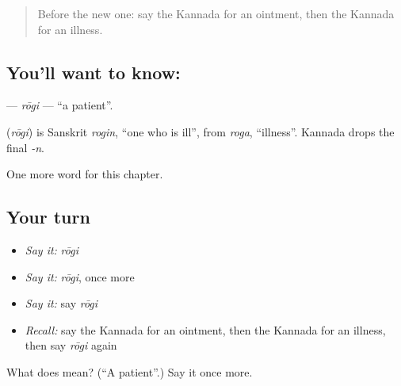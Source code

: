 \label{lesson:KA-C208-rogi}



\begin{quote}
Before the new one: say the Kannada for an ointment, then the Kannada for an illness.
\end{quote}

\subsection*{You'll want to know: }
\textbf{} — \emph{rōgi} — \textquotedblleft{}a patient\textquotedblright{}.

\begin{cousinweb}
\textbf{} (\emph{rōgi}) is Sanskrit \emph{rogin}, \textquotedblleft{}one who is ill\textquotedblright{}, from \emph{roga}, \textquotedblleft{}illness\textquotedblright{}. Kannada drops the final \emph{-n}.
\end{cousinweb}

\begin{grammarlens}[title={What you've built}]
One more word for this chapter.
\end{grammarlens}

\subsection*{Your turn}
\begin{itemize}
\raggedright
  \item \emph{Say it:} \emph{rōgi}
  \item \emph{Say it:} \emph{rōgi}, once more
  \item \emph{Say it:} say \emph{rōgi}
  \item \emph{Recall:} say the Kannada for an ointment, then the Kannada for an illness, then say \emph{rōgi} again
\end{itemize}

\begin{tcolorbox}[breakable,colback=teal!4,colframe=teal!35!black,title={Before you move on}]
What does  mean? (\textquotedblleft{}A patient\textquotedblright{}.) Say it once more.
\end{tcolorbox}
